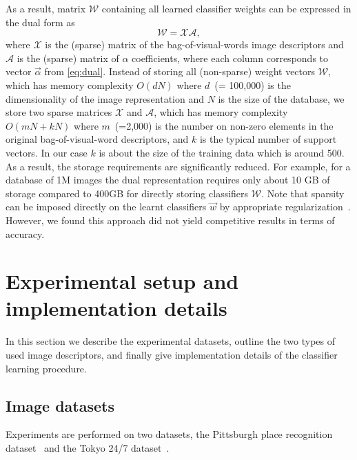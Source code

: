    
    As a result, matrix $\mathcal{W}$ containing all learned classifier weights can be expressed in the dual form as
      \begin{equation}
        \label{eq:dualFinal}
        \mathcal{W} = \mathcal{X} \mathcal{A},  
      \end{equation}
    \noindent
    where $\mathcal{X}$ is the (sparse) matrix of the bag-of-visual-words image descriptors and $\mathcal{A}$ is the (sparse) matrix of $\alpha$ coefficients, 
    where each column corresponds to vector $\vec{\alpha}$ from \eqref{eq:dual}. 
    Instead of storing all (non-sparse) weight vectors $\mathcal{W}$, which has memory complexity $O(dN)$ where $d$~(= 100,000) is the dimensionality of the image representation and $N$ is the size of the database, we store two sparse matrices $\mathcal{X}$ and $\mathcal{A}$, which has memory complexity $O(mN+kN)$ where $m$~(=2,000) is the number on non-zero elements in the original bag-of-visual-word descriptors, and $k$ is the typical number of support vectors. In our case $k$ is about the size of the training data which is around 500. As a result, the storage requirements are significantly reduced. For example, for a database of 1M images the dual representation requires only about 10 GB of storage compared to 400GB for directly storing classifiers $\mathcal{W}$.  
    Note that sparsity can be imposed directly on the learnt classifiers $\vec{w}$ by appropriate regularization~\cite{scholkopf2002learning}. However, we found this approach did not yield competitive results \textcolor{petr}{in terms of accuracy}.


\section{Experimental setup and implementation details}
\label{sec:experiments}
  In this section we describe the experimental datasets, outline the two types of used image descriptors, and finally give implementation details of the classifier learning procedure.
  

  \subsection{Image datasets}
  \textcolor{petr}{
Experiments are performed on two datasets, the Pittsburgh place recognition dataset~\cite{Gronat13} and the Tokyo 24/7 dataset~\cite{Torii2015}. 
  }
